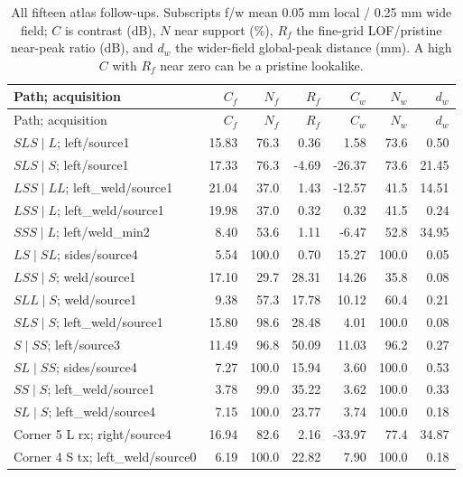 \documentclass[11pt]{article}
\begin{document}
\begingroup\small\setlength{\tabcolsep}{3pt}
\begin{longtable}{@{}>{\raggedright\arraybackslash}p{.34\linewidth}rrrrrr@{}}
\caption{All fifteen atlas follow-ups. Subscripts f/w mean 0.05 mm local / 0.25 mm wide field; $C$ is contrast (dB), $N$ near support (\%), $R_f$ the fine-grid LOF/pristine near-peak ratio (dB), and $d_w$ the wider-field global-peak distance (mm). A high $C$ with $R_f$ near zero can be a pristine lookalike.}\label{saft:path_confirmation}\\
\toprule Path; acquisition & $C_f$ & $N_f$ & $R_f$ & $C_w$ & $N_w$ & $d_w$\\\midrule\endfirsthead
\toprule Path; acquisition & $C_f$ & $N_f$ & $R_f$ & $C_w$ & $N_w$ & $d_w$\\\midrule\endhead
$SLS\mid L$; left/source1 & 15.83 & 76.3 & 0.36 & 1.58 & 73.6 & 0.50\\
$SLS\mid S$; left/source1 & 17.33 & 76.3 & -4.69 & -26.37 & 73.6 & 21.45\\
$LSS\mid LL$; left\_\allowbreak weld/source1 & 21.04 & 37.0 & 1.43 & -12.57 & 41.5 & 14.51\\
$LSS\mid L$; left\_\allowbreak weld/source1 & 19.98 & 37.0 & 0.32 & 0.32 & 41.5 & 0.24\\
$SSS\mid L$; left/weld\_\allowbreak min2 & 8.40 & 53.6 & 1.11 & -6.47 & 52.8 & 34.95\\
$LS\mid SL$; sides/source4 & 5.54 & 100.0 & 0.70 & 15.27 & 100.0 & 0.05\\
$LSS\mid S$; weld/source1 & 17.10 & 29.7 & 28.31 & 14.26 & 35.8 & 0.08\\
$SLL\mid S$; weld/source1 & 9.38 & 57.3 & 17.78 & 10.12 & 60.4 & 0.21\\
$SLS\mid S$; left\_\allowbreak weld/source1 & 15.80 & 98.6 & 28.48 & 4.01 & 100.0 & 0.08\\
$S\mid SS$; left/source3 & 11.49 & 96.8 & 50.09 & 11.03 & 96.2 & 0.27\\
$SL\mid SS$; sides/source4 & 7.27 & 100.0 & 15.94 & 3.60 & 100.0 & 0.53\\
$SS\mid S$; left\_\allowbreak weld/source1 & 3.78 & 99.0 & 35.22 & 3.62 & 100.0 & 0.33\\
$SL\mid S$; left\_\allowbreak weld/source4 & 7.15 & 100.0 & 23.77 & 3.74 & 100.0 & 0.18\\
Corner 5 L rx; right/source4 & 16.94 & 82.6 & 2.16 & -33.97 & 77.4 & 34.87\\
Corner 4 S tx; left\_\allowbreak weld/source0 & 6.19 & 100.0 & 22.82 & 7.90 & 100.0 & 0.18\\
\bottomrule\end{longtable}\endgroup
\end{document}
